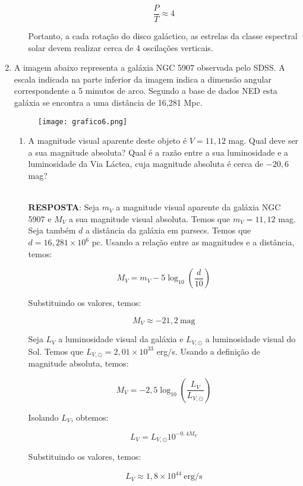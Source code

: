 \documentclass[a4paper,12pt]{article}
\begin{document}
\begin{enumerate}
\begin{enumerate}
$$
\frac{P}{T} \approx 4
$$

Portanto, a cada rotação do disco galáctico, as estrelas da classe espectral solar devem realizar cerca de 4 oscilações verticais.

\end{enumerate}

\noindent\hrulefill

\item A imagem abaixo representa a galáxia NGC 5907 observada pelo SDSS. A escala indicada na parte inferior da imagem indica a dimensão angular correspondente a 5 minutos de arco. Segundo a base de dados NED esta galáxia se encontra a uma distância de 16,281 Mpc.
    
\begin{figure}[H]
\centering
\texttt{[image: grafico6.png]}
\end{figure}

\begin{enumerate}
\item A magnitude visual aparente deste objeto é $V=11,12$ mag. Qual deve ser a sua magnitude absoluta? Qual é a razão entre a sua luminosidade e a luminosidade da Via Láctea, cuja magnitude absoluta é cerca de $-20,6$ mag?

\noindent\hrulefill\\\textbf{RESPOSTA}: Seja $m_V$ a magnitude visual aparente da galáxia NGC 5907 e $M_V$ a sua magnitude visual absoluta. Temos que $m_V = 11,12$ mag. Seja também $d$ a distância da galáxia em parsecs. Temos que $d = 16,281 \times 10^6$ pc. Usando a relação entre as magnitudes e a distância, temos:

$$
M_V = m_V - 5 \log_{10} \left( \frac{d}{10} \right)
$$

Substituindo os valores, temos:

$$
M_V \approx -21,2~\text{mag}
$$

Seja $L_V$ a luminosidade visual da galáxia e $L_{V,\odot}$ a luminosidade visual do Sol. Temos que $L_{V,\odot} = 2,01 \times 10^{33}$ erg/s. Usando a definição de magnitude absoluta, temos:

$$
M_V = -2,5 \log_{10} \left( \frac{L_V}{L_{V,\odot}} \right)
$$

Isolando $L_V$, obtemos:

$$
L_V = L_{V,\odot} 10^{-0,4 M_V}
$$

Substituindo os valores, temos:

$$
L_V \approx 1,8 \times 10^{44}~\text{erg/s}
$$


\end{enumerate}
\end{enumerate}
\end{document}
